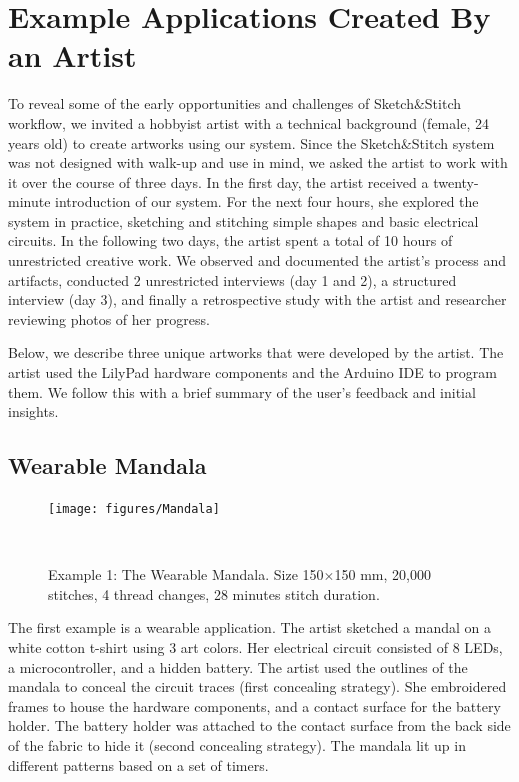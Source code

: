 \documentclass[header.tex]{subfiles}
\begin{document}
 







\section{Example Applications Created By an Artist} %
To reveal some of the early opportunities and challenges of Sketch\&Stitch workflow, we invited a hobbyist artist with a technical background (female, 24 years old) to create artworks using our system. Since the Sketch\&Stitch system was not designed with walk-up and use in mind, we asked the artist to work with it over the course of three days. In the first day, the artist received a twenty-minute introduction of our system. For the next four hours, she explored the system in practice, sketching and stitching simple shapes and basic electrical circuits. In the following two days, the artist spent a total of 10 hours of unrestricted creative work. We observed and documented the artist's process and artifacts, conducted 2 unrestricted interviews (day 1 and 2), a structured interview (day 3), and finally a retrospective study with the artist and researcher reviewing photos of her progress.

Below, we describe three unique artworks that were developed by the artist. The artist used the LilyPad hardware components and the Arduino IDE to program them. We follow this with a brief summary of the user's feedback and  initial insights. 



\subsection{Wearable Mandala}
\begin{figure} [h!]
\centering
  \texttt{[image: figures/Mandala]} 
  \caption{Example 1: The Wearable Mandala. Size 150$\times$150 mm, 20,000 stitches, 4 thread changes, 28 minutes stitch duration.}~\label{fig:Mandala}
  \vspace{-1.5em}
\end{figure}
The first example is a wearable application. The artist sketched a mandal on a white cotton t-shirt using 3 art colors. Her electrical circuit consisted of 8 LEDs, a microcontroller, and a hidden battery. The artist used the outlines of the mandala to conceal the circuit traces (first concealing strategy). She embroidered frames to house the hardware components, and a contact surface for the battery holder. The battery holder was attached to the contact surface from the back side of the fabric to hide it (second concealing strategy). The mandala lit up in different patterns based on a set of timers. 
\end{document}

